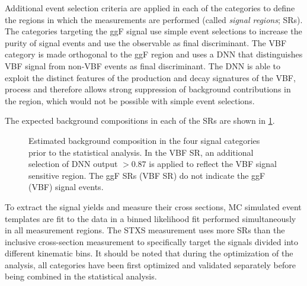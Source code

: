 Additional event selection criteria are applied in each of the categories to define the regions in which the measurements are performed (called \emph{signal regions}; SRs).
The categories targeting the ggF signal use simple event selections to increase the purity of signal events and use the \mT observable as final discriminant. 
The VBF \TwoJet category is made orthogonal to the ggF \TwoJet region and uses a DNN that distinguishes VBF signal from non-VBF events as final discriminant.
The DNN is able to exploit the distinct features of the production and decay signatures of the VBF, \HWW process and therefore allows strong suppression of background contributions in the \TwoJet region, which would not be possible with simple event selections. 

The expected background compositions in each of the SRs are shown in \cref{fig:bkg-composition}.
\begin{figure}[ht]
     \hfill
    \caption{Estimated background composition in the four signal categories prior to the statistical analysis. In the VBF \TwoJet SR, an additional selection of DNN output $>0.87$ is applied to reflect the VBF signal sensitive region. The ggF SRs (VBF SR) do not indicate the ggF (VBF) signal events.}
    \label{fig:bkg-composition}
\end{figure}
To extract the signal yields and measure their cross sections, MC simulated event templates are fit to the data in a binned 
likelihood fit performed simultaneously in all measurement regions.
The STXS measurement uses more SRs than the inclusive cross-section measurement to specifically target the signals divided into different kinematic bins. 
It should be noted that during the optimization of the analysis, all categories have been first optimized and validated separately before being combined in the statistical analysis.


